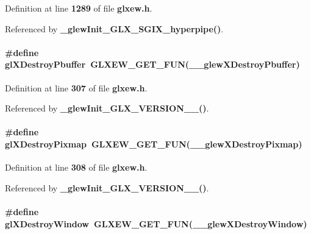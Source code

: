 Definition at line {\bf 1289} of file {\bf glxew.\+h}.



Referenced by {\bf \+\_\+glew\+Init\+\_\+\+G\+L\+X\+\_\+\+S\+G\+I\+X\+\_\+hyperpipe()}.

\paragraph[{gl\+X\+Destroy\+Pbuffer}]{\setlength{\rightskip}{0pt plus 5cm}\#define gl\+X\+Destroy\+Pbuffer~{\bf G\+L\+X\+E\+W\+\_\+\+G\+E\+T\+\_\+\+F\+UN}({\bf \+\_\+\+\_\+glew\+X\+Destroy\+Pbuffer})}\label{glxew_8h_a5ede232d85000c2f59572ff29a9f1780}


Definition at line {\bf 307} of file {\bf glxew.\+h}.



Referenced by {\bf \+\_\+glew\+Init\+\_\+\+G\+L\+X\+\_\+\+V\+E\+R\+S\+I\+O\+N\+\_\+\_()}.

\paragraph[{gl\+X\+Destroy\+Pixmap}]{\setlength{\rightskip}{0pt plus 5cm}\#define gl\+X\+Destroy\+Pixmap~{\bf G\+L\+X\+E\+W\+\_\+\+G\+E\+T\+\_\+\+F\+UN}({\bf \+\_\+\+\_\+glew\+X\+Destroy\+Pixmap})}\label{glxew_8h_a5d1338ca5d8841d585b208472b5eb601}


Definition at line {\bf 308} of file {\bf glxew.\+h}.



Referenced by {\bf \+\_\+glew\+Init\+\_\+\+G\+L\+X\+\_\+\+V\+E\+R\+S\+I\+O\+N\+\_\+\_()}.

\paragraph[{gl\+X\+Destroy\+Window}]{\setlength{\rightskip}{0pt plus 5cm}\#define gl\+X\+Destroy\+Window~{\bf G\+L\+X\+E\+W\+\_\+\+G\+E\+T\+\_\+\+F\+UN}({\bf \+\_\+\+\_\+glew\+X\+Destroy\+Window})}\label{glxew_8h_ae2406b2df908b37a3e60d940a6632723}


